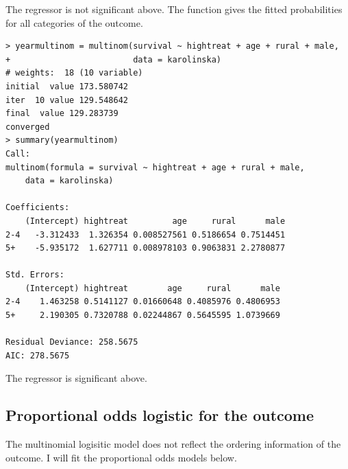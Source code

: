 The regressor  is not significant above.  The  function gives the fitted probabilities for all categories of the outcome. 

\begin{lstlisting}
> yearmultinom = multinom(survival ~ hightreat + age + rural + male,
+                         data = karolinska)
# weights:  18 (10 variable)
initial  value 173.580742 
iter  10 value 129.548642
final  value 129.283739 
converged
> summary(yearmultinom)
Call:
multinom(formula = survival ~ hightreat + age + rural + male, 
    data = karolinska)

Coefficients:
    (Intercept) hightreat         age     rural      male
2-4   -3.312433  1.326354 0.008527561 0.5186654 0.7514451
5+    -5.935172  1.627711 0.008978103 0.9063831 2.2780877

Std. Errors:
    (Intercept) hightreat        age     rural      male
2-4    1.463258 0.5141127 0.01660648 0.4085976 0.4806953
5+     2.190305 0.7320788 0.02244867 0.5645595 1.0739669

Residual Deviance: 258.5675 
AIC: 278.5675 
\end{lstlisting}

The regressor  is significant above. 





\subsection{Proportional odds logistic for the outcome}

 


The multinomial logisitic model does not reflect the ordering information of the outcome.  I will fit the proportional odds models below. 


